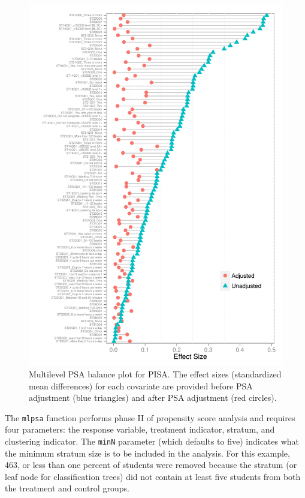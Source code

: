 \documentclass[letterpaper,12p,twoside]{article} %
\begin{document}
\setlength{\belowcaptionskip}{-10pt}
\begin{figure}[h!]
\begin{center}
\includegraphics[height=.90\textheight]{../Figures/pisabalance.pdf}
\caption[Multilevel PSA balance plot for PISA]{Multilevel PSA balance plot for PISA. The effect sizes (standardized mean differences) for each covariate are provided before PSA adjustment (blue triangles) and after PSA adjustment (red circles).}
\end{center}
\end{figure}
\setlength{\belowcaptionskip}{0pt}

\clearpage

The \texttt{mlpsa} function performs phase II of propensity score analysis and requires four parameters: the response variable, treatment indicator, stratum, and clustering indicator. The \texttt{minN} parameter (which defaults to five) indicates what the minimum stratum size is to be included in the analysis. For this example, 463, or less than one percent of students were removed because the stratum (or leaf node for classification trees) did not contain at least five students from both the treatment and control groups.
\end{document}
